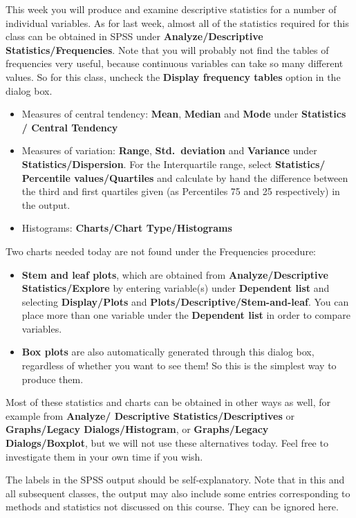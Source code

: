 This week you will produce and examine descriptive statistics for a number of
individual variables.
As for last week, almost all of the statistics
required for this class can be obtained in SPSS
under \textbf{Analyze/Descriptive Statistics/Frequencies}. Note that you will probably
not find the tables of frequencies very useful, because continuous variables can take
so many different values. So for this class, uncheck the \textbf{Display frequency tables}
option in the dialog box.
\begin{itemize}
\item
Measures of central tendency: \textbf{Mean}, \textbf{Median} and
\textbf{Mode} under \textbf{Statistics / Central Tendency}
\item
Measures of variation: \textbf{Range}, \textbf{Std.\ deviation} and
\textbf{Variance}
under \textbf{Statistics/Dispersion}. For the Interquartile
range, select \textbf{Statistics/ Percentile values/Quartiles}
and calculate by hand the difference between the third and first quartiles
given (as Percentiles 75 and 25 respectively) in the output.
\item
Histograms: \textbf{Charts/Chart Type/Histograms}
\end{itemize}
Two charts needed today
are not found under the Frequencies procedure:
\begin{itemize}
\item
\textbf{Stem and leaf plots}, which
are obtained from \textbf{Analyze/Descriptive Statistics/Explore} by
entering variable(s) under \textbf{Dependent list} and selecting
\textbf{Display/Plots} and \textbf{Plots/Descriptive/Stem-and-leaf}. You can place
 more than one variable under the \textbf{Dependent list} in order to compare variables.
\item
\textbf{Box plots} are also automatically generated through this dialog box,
regardless of whether you want to see them! So this is the simplest way
to produce them.
\end{itemize}
Most of these statistics and charts can be obtained in other ways as well, for example from
\textbf{Analyze/ Descriptive Statistics/Descriptives} or
\textbf{Graphs/Legacy Dialogs/Histogram}, or \textbf{Graphs/Legacy Dialogs/Boxplot},
but we will not use these alternatives today. Feel free to investigate them in your own time if
you wish.

The labels in the SPSS output should be self-explanatory. Note that in
this and all subsequent classes, the output may also include some
entries corresponding to methods and statistics not discussed on this
course. They can be ignored here.

